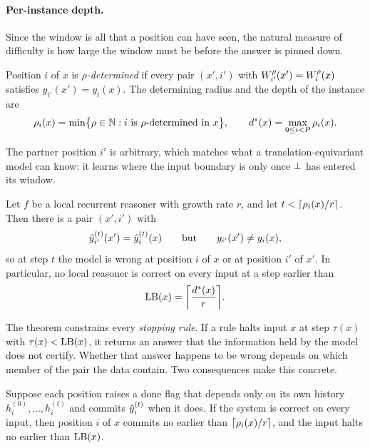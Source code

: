 \paragraph{Per-instance depth.}
Since the window is all that a position can have seen, the natural measure of difficulty is how large
the window must be before the answer is pinned down.

\begin{definition}\label{def:depth}
Position $i$ of $x$ is \emph{$\rho$-determined} if every pair $(x', i')$ with
$W_{i'}^{\rho}(x') = W_{i}^{\rho}(x)$ satisfies $y_{i'}(x') = y_i(x)$. The determining radius and
the depth of the instance are
\begin{equation}
  \rho_i(x) = \min\bigl\{\rho\in\mathbb{N} : i \text{ is $\rho$-determined in } x\bigr\},
  \qquad
  d^{*}(x) = \max_{0\le i<P}\rho_i(x).
  \label{eq:depth}
\end{equation}
\end{definition}

The partner position $i'$ is arbitrary, which matches what a translation-equivariant model can know:
it learns where the input boundary is only once $\bot$ has entered its window.

\begin{theorem}\label{thm:lb}
Let $f$ be a local recurrent reasoner with growth rate $r$, and let $t < \lceil\rho_i(x)/r\rceil$. Then
there is a pair $(x', i')$ with
\begin{equation*}
  \hat{y}_{i'}^{(t)}(x') = \hat{y}_i^{(t)}(x)
  \qquad\text{but}\qquad
  y_{i'}(x') \ne y_i(x),
\end{equation*}
so at step $t$ the model is wrong at position $i$ of $x$ or at position $i'$ of $x'$. In particular,
no local reasoner is correct on every input at a step earlier than
\begin{equation}
  \LB(x) = \ceil*{\frac{\dstar(x)}{r}}.
  \label{eq:lb}
\end{equation}
\end{theorem}

The theorem constrains every \emph{stopping rule}. If a rule halts input $x$ at step $\tau(x)$ with
$\tau(x) < \operatorname{LB}(x)$, it returns an answer that the information held by the model does not certify.
Whether that answer happens to be wrong depends on which member of the pair the data contain. Two
consequences make this concrete.

\begin{corollary}\label{cor:local}
Suppose each position raises a done flag that depends only on its own history
$h_i^{(0)},\dots,h_i^{(t)}$ and commits $\hat{y}_i^{(t)}$ when it does. If the system is correct on every
input, then position $i$ of $x$ commits no earlier than $\lceil\rho_i(x)/r\rceil$, and the input halts no
earlier than $\operatorname{LB}(x)$.
\end{corollary}

